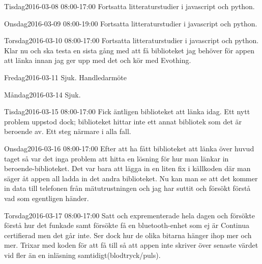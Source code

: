 \documentclass[a4paper,oneside]{book}
\begin{document}
\begin{diary}{Tisdag}{2016-03-08 08:00-17:00}
	Fortsatta litteraturstudier i javascript och python.
\end{diary}

\begin{diary}{Onsdag}{2016-03-09 08:00-19:00}
	Fortsatta litteraturstudier i javascript och python.
\end{diary}

\begin{diary}{Torsdag}{2016-03-10 08:00-17:00}
	Fortsatta litteraturstudier i javascript och python. Klar nu och ska testa en sista gång med att få biblioteket jag behöver för appen att länka innan jag ger upp med det och kör med Evothing.
\end{diary}

\begin{diary}{Fredag}{2016-03-11}
	Sjuk. Handledarmöte
\end{diary}

\begin{diary}{Måndag}{2016-03-14}
	Sjuk.
\end{diary}

\begin{diary}{Tisdag}{2016-03-15 08:00-17:00}
	Fick äntligen biblioteket att länka idag. Ett nytt problem uppstod dock; biblioteket hittar inte ett annat bibliotek som det är beroende av. Ett steg närmare i alla fall.
\end{diary}

\begin{diary}{Onsdag}{2016-03-16 08:00-17:00}
	Efter att ha fått biblioteket att länka över huvud taget så var det inga problem att hitta en lösning för hur man länkar in beroende-biblioteket. Det var bara att lägga in en liten fix i källkoden där man säger åt appen all ladda in det andra biblioteket. Nu kan man se att det kommer in data till telefonen från mätutrustningen och jag har suttit och försökt förstå vad som egentligen händer.
\end{diary}

\begin{diary}{Torsdag}{2016-03-17 08:00-17:00}
	Satt och exprementerade hela dagen och försökte förstå hur det funkade samt försökte få en bluetooth-enhet som ej är Continua certifierad men det går inte. Ser dock hur de olika bitarna hänger ihop mer och mer. Trixar med koden för att få till så att appen inte skriver över senaste värdet vid fler än en inläsning samtidigt(blodtryck/puls).
\end{diary}
\end{document}
